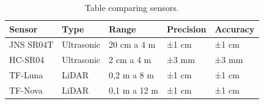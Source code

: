 \begin{table}
	\ABNTEXfontereduzida
	\caption{\label{tab:Tab_2}Table comparing sensors.}
 \begin{center}
	\begin{tabular}{@{}p{2.0cm}p{2cm}p{2.5cm}p{2cm}p{2.0cm}@{}}
		\toprule
		\textbf{Sensor} & \textbf{Type} & \textbf{Range} & \textbf{Precision} & \textbf{Accuracy} \\ \midrule
		JNS SR04T & Ultrasonic & 20 cm a 4 m & ±1 cm  & ±1 cm \\
		HC-SR04 & Ultrasonic & 2 cm a 4 m & ±3 mm  & ±3 mm \\
		TF-Luna & \gls{LiDAR} & 0,2 m a 8 m & ±1 cm   & ±1 cm \\
		TF-Nova & \gls{LiDAR} & 0,1 m a 12 m & ±1 cm  & ±1 cm \\
  \bottomrule
	\end{tabular} 
 \end{center}
	\label{tab:comparativo}
\end{table}

